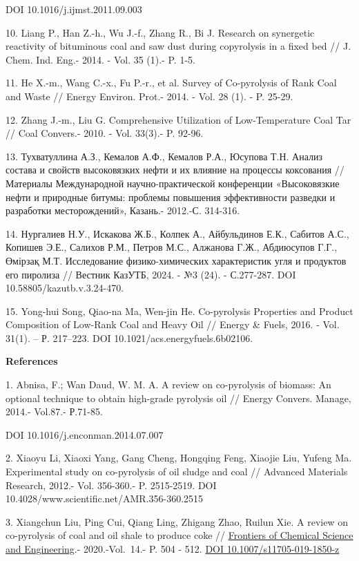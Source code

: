 DOI 10.1016/j.ijmst.2011.09.003

10. Liang P., Han Z.-h., Wu J.-f., Zhang R., Bi J. Research on
synergetic reactivity of bituminous coal and saw dust during copyrolysis
in a fixed bed // J. Chem. Ind. Eng.- 2014. - Vol. 35 (1).- P. 1-5.

11. He X.-m., Wang C.-x., Fu P.-r., et al. Survey of Co-pyrolysis of
Rank Coal and Waste // Energy Environ. Prot.- 2014. - Vol. 28 (1). - P.
25-29.

12. Zhang J.-m., Liu G. Comprehensive Utilization of Low-Temperature
Coal Tar // Coal Convers.- 2010. - Vol. 33(3).- P. 92-96.

13. Тухватуллина А.З., Кемалов А.Ф., Кемалов Р.А., Юсупова Т.Н. Анализ
состава и свойств высоковязких нефти и их влияние на процессы коксования
// Материалы Международной научно-практической конференции «Высоковязкие
нефти и природные битумы: проблемы повышения эффективности разведки и
разработки месторождений», Казань.- 2012.-С. 314-316.

14. Нургалиев Н.У., Искакова Ж.Б., Колпек А., Айбульдинов Е.К., Сабитов
А.С., Копишев Э.Е., Салихов Р.М., Петров М.С., Алжанова Г.Ж., Абдиюсупов
Г.Г., Өмірзақ М.Т. Исследование физико-химических характеристик угля и
продуктов его пиролиза // Вестник КазУТБ, 2024. - №3 (24). - С.277-287.
DOI 10.58805/kazutb.v.3.24-470.

15. Yong-hui Song, Qiao-na Ma, Wen-jin He. Co-pyrolysis Properties and
Product Composition of Low-Rank Coal and Heavy Oil // Energy \& Fuels,
2016. - Vol. 31(1). -- Р. 217--223. DOI
10.1021/acs.energyfuels.6b02106.~

{\bfseries References}

1. Abnisa, F.; Wan Daud, W. M. A. A review on co-pyrolysis of biomass:
An optional technique to obtain high-grade pyrolysis oil // Energy
Convers. Manage, 2014.- Vol.87.- Р.71-85.

DOI 10.1016/j.enconman.2014.07.007

2. Xiaoyu Li, Xiaoxi Yang, Gang Cheng, Hongqing Feng, Xiaojie Liu,
Yufeng Ma. Experimental study on co-pyrolysis of oil sludge and coal //
Advanced Materials Research, 2012.- Vol. 356-360.- P. 2515-2519. DOI
10.4028/www.scientific.net/AMR.356-360.2515

3. Xiangchun Liu, Ping Cui, Qiang Ling, Zhigang Zhao, Ruilun Xie. A
review on co-pyrolysis of coal and oil shale to produce coke //
\href{https://link.springer.com/journal/11705}{Frontiers of Chemical
Science and Engineering}.- 2020.-Vol.~14.- P. 504 - 512.
\href{https://doi.org/10.1007/s11705-019-1850-z}{DOI
10.1007/s11705-019-1850-z}

